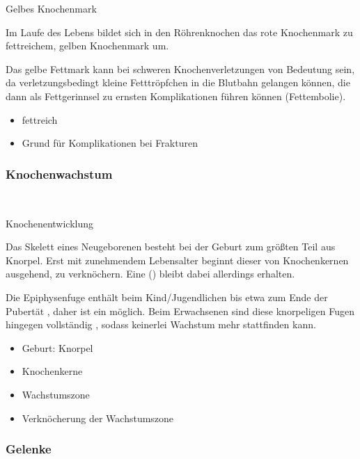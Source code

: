 {Gelbes Knochenmark}
{
Im Laufe des Lebens bildet sich in den
Röhrenknochen das rote Knochenmark  zu fettreichem, gelben
Knochenmark um.

Das gelbe Fettmark kann bei schweren Knochenverletzungen von Bedeutung
sein, da verletzungs\-bedingt kleine Fetttröpfchen in die
Blutbahn gelangen können, die dann als Fettgerinnsel  zu ernsten
Komplikationen führen können
(Fettembolie).

}
{
\begin{itemize}
  \item fettreich
  \item Grund für Komplikationen bei Frakturen
\end{itemize}
}
{}{}{}

\subsubsection{Knochenwachstum}~

{Knochenentwicklung}
{
Das Skelett eines Neugeborenen besteht bei der Geburt zum größten
Teil aus Knorpel. Erst mit zunehmendem Lebensalter beginnt dieser von
Knochenkernen ausgehend, zu verknöchern. Eine
() bleibt dabei allerdings erhalten.

Die Epiphysenfuge enthält beim Kind/Jugendlichen bis
etwa zum Ende der Pubertät , daher ist ein 
möglich. Beim Erwachsenen sind diese knorpeligen Fugen
hingegen vollständig , sodass
keinerlei Wachstum mehr stattfinden kann.
}
{
\begin{itemize}
  \item Geburt: Knorpel
  \item Knochenkerne
  \item Wachstumszone
  \item Verknöcherung der Wachstumszone
\end{itemize}
}
{}{}{}

\subsubsection{Gelenke}


